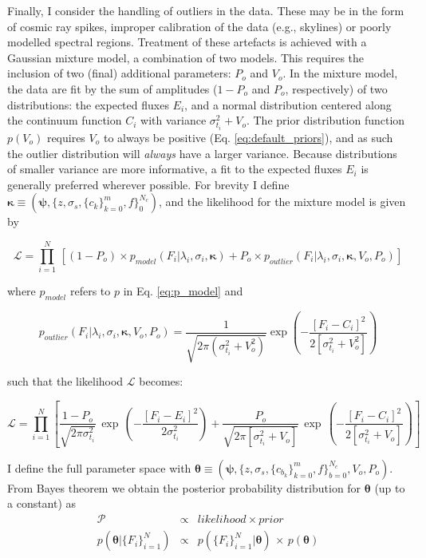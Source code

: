 \documentclass{aastex}
\begin{document}
Finally, I consider the handling of outliers in the data. These may be in the form of cosmic ray spikes, improper calibration of the data (e.g., skylines) or poorly modelled spectral regions. Treatment of these artefacts is achieved with a Gaussian mixture model, a combination of two models. This requires the inclusion of two (final) additional parameters: $P_o$ and $V_o$. In the mixture model, the data are fit by the sum of amplitudes ($1 - P_o$ and $P_o$, respectively) of two distributions: the expected fluxes $E_i$, and a normal distribution centered along the continuum function $C_i$ with variance $\sigma_{t_i}^2 + V_{o}$. The prior distribution function $p\left(V_o\right)$ requires $V_{o}$ to always be positive (Eq. \ref{eq:default_priors}), and as such the outlier distribution will \textit{always} have a larger variance. Because distributions of smaller variance are more informative, a fit to the expected fluxes $E_{i}$ is generally preferred wherever possible. For brevity I define $\bm{\kappa} \equiv (\bm{\psi},\{z,\sigma_s,\{c_k\}_{k=0}^{m},f\}_{0}^{N_{c}})$, and the likelihood for the mixture model is given by
 
 \begin{equation}
\mathcal{L} = \prod_{i=1}^{N}\,\left[\left(1 - P_{o}\right)\times{}p_{model}\left(F_i|\lambda_i,\sigma_{i},\bm{\kappa}\right) + P_{o}\times{}p_{outlier}\left(F_i|\lambda_i,\sigma_i,\bm{\kappa},V_{o},P_o\right)\right]
\end{equation}
 
\noindent{}where $p_{model}$ refers to $p$ in Eq. \ref{eq:p_model} and 

\begin{equation}
p_{outlier}\left(F_i|\lambda_i,\sigma_i,\bm{\kappa},V_{o},P_o\right) = \frac{1}{\sqrt{2\pi\left(\sigma_{t_i}^2 + V_{o}^2\right)}} \exp\left(-\frac{[F_i - C_i]^2}{2\left[\sigma_{t_i}^2 + V_{o}^2\right]}\right)
\end{equation}

\noindent{}such that the likelihood $\mathcal{L}$ becomes:

\begin{equation}
\mathcal{L} = \prod_{i=1}^{N} \left[ \frac{1-P_o}{\sqrt{2\pi\sigma_{t_i}^2}}\,\exp\,\left(-\frac{[F_i - E_i]^2}{2\sigma_{t_i}^{2}}\right) + \frac{P_o}{\sqrt{2\pi\left[\sigma_{t_i}^2 + V_o\right]}}\,\exp\,\left(-\frac{[F_i - C_i]^2}{2\left[\sigma_{t_i}^{2} + V_o\right]}\right)\right]
\label{eq:full_likelihood}
\end{equation}

I define the full parameter space with $\bm{\theta} \equiv \left(\bm{\psi},\{z,\sigma_s,\{c_{b_k}\}_{k=0}^{m},f\}_{b=0}^{N_{c}},V_o,P_o\right)$. From Bayes theorem we obtain the posterior probability distribution for $\bm{\theta}$ (up to a constant) as
\begin{eqnarray}
\mathcal{P} & \propto & likelihood \times prior \nonumber \\
p(\bm{\theta}|\{F_i\}_{i=1}^{N}) & \propto & p(\{F_i\}_{i=1}^{N}|\bm{\theta})\,\times\,p(\bm{\theta})
\label{eq:probability}
\end{eqnarray}
\end{document}

